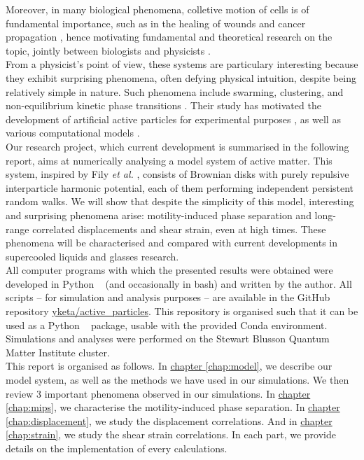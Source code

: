 \documentclass[class=report, float=false, crop=false]{standalone}
\begin{document}
Moreover, in many biological phenomena, colletive motion of cells is of fundamental importance, such as in the healing of wounds \cite{haga2005collective} and cancer propagation \cite{friedl2009collective}, hence motivating fundamental and theoretical research on the topic, jointly between biologists and physicists \cite{garcia2015physics}.\\

From a physicist's point of view, these systems are particulary interesting because they exhibit surprising phenomena, often defying physical intuition, despite being relatively simple in nature. Such phenomena include swarming, clustering, and non-equilibrium kinetic phase transitions \cite{vicsek1995novel, szabo2006phase}. Their study has motivated the development of artificial active particles for experimental purposes \cite{howse2007self, theurkauff2012dynamic}, as well as various computational models \cite{garcia2015physics, vicsek1995novel, levis2014clustering, wysocki2014cooperative, fily2014freezing, redner2013structure}.\\

Our research project, which current development is summarised in the following report, aims at numerically analysing a model system of active matter. This system, inspired by Fily \textit{et al.} \cite{fily2012athermal, fily2014freezing}, consists of Brownian disks with purely repulsive interparticle harmonic potential, each of them performing independent persistent random walks. We will show that despite the simplicity of this model, interesting and surprising phenomena arise: motility-induced phase separation and long-range correlated displacements and shear strain, even at high times. These phenomena will be characterised and compared with current developments in supercooled liquids and glasses research.\\

All computer programs with which the presented results were obtained were developed in Python \faPython~ (and occasionally in bash) and written by the author. All scripts -- for simulation and analysis purposes -- are available in the GitHub \faGithub~ repository \href{https://github.com/yketa/active_particles}{yketa/active\_particles}. This repository is organised such that it can be used as a Python \faPython~ package, usable with the provided Conda environment. Simulations and analyses were performed on the Stewart Blusson Quantum Matter Institute cluster.\\

This report is organised as follows. In \hyperref[chap:model]{chapter \ref{chap:model}}, we describe our model system, as well as the methods we have used in our simulations. We then review 3 important phenomena observed in our simulations. In \hyperref[chap:mips]{chapter \ref{chap:mips}}, we characterise the motility-induced phase separation. In \hyperref[chap:displacement]{chapter \ref{chap:displacement}}, we study the displacement correlations. And in \hyperref[chap:strain]{chapter \ref{chap:strain}}, we study the shear strain correlations. In each part, we provide details on the implementation of every calculations.
\end{document}

